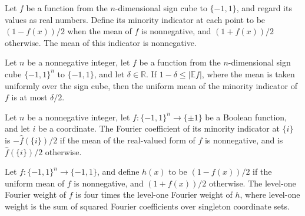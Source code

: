 \begin{theorem}
\label{FABL.mean_nearlyConstantMinorityIndicator_nonneg}
\leanok
{}
Let $f$ be a function from the $n$-dimensional sign cube to $\{-1,1\}$, and regard its
values as real numbers. Define its minority indicator at each point to be $(1-f(x))/2$
when the mean of $f$ is nonnegative, and $(1+f(x))/2$ otherwise. The mean of this
indicator is nonnegative.
\end{theorem}

\begin{theorem}
\label{FABL.mean_nearlyConstantMinorityIndicator_le}
\leanok
{}
Let $n$ be a nonnegative integer, let $f$ be a function from the $n$-dimensional sign
cube $\{-1,1\}^n$ to $\{-1,1\}$, and let $\delta\in\mathbb R$. If $1-\delta\le |\mathbb
E f|$, where the mean is taken uniformly over the sign cube, then the uniform mean of
the minority indicator of $f$ is at most $\delta/2$.
\end{theorem}

\begin{theorem}
\label{FABL.fourierCoeff_nearlyConstantMinorityIndicator_singleton}
\leanok
{}
Let $n$ be a nonnegative integer, let $f:\{-1,1\}^n\to\{\pm1\}$ be a Boolean function,
and let $i$ be a coordinate. The Fourier coefficient of its minority indicator at
$\{i\}$ is $-\widehat f(\{i\})/2$ if the mean of the real-valued form of $f$ is
nonnegative, and is $\widehat f(\{i\})/2$ otherwise.
\end{theorem}

\begin{theorem}
\label{FABL.fourierWeightAtLevel_one_eq_four_mul_nearlyConstantMinorityIndicator}
\leanok
{}
Let $f:\{-1,1\}^n\to\{-1,1\}$, and define $h(x)$ to be $(1-f(x))/2$ if the uniform mean
of $f$ is nonnegative, and $(1+f(x))/2$ otherwise. The level-one Fourier weight of $f$
is four times the level-one Fourier weight of $h$, where level-one weight is the sum of
squared Fourier coefficients over singleton coordinate sets.
\end{theorem}

